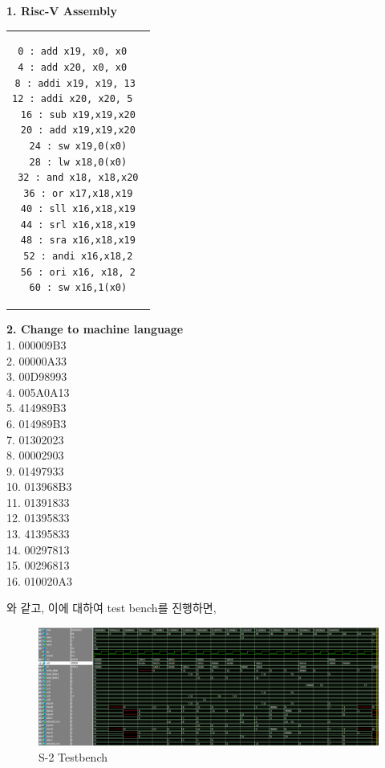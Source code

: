 \documentclass[oneside]{article}
\begin{document}
\begin{center}
\textbf{1. Risc-V Assembly}
\end{center}

\begin{center}
\begin{tabular}{c}
\begin{lstlisting}[language={[RISC-V]Assembler}]
0 : add x19, x0, x0  
4 : add x20, x0, x0  
8 : addi x19, x19, 13 
12 : addi x20, x20, 5  
16 : sub x19,x19,x20
20 : add x19,x19,x20
24 : sw x19,0(x0)
28 : lw x18,0(x0)
32 : and x18, x18,x20
36 : or x17,x18,x19
40 : sll x16,x18,x19
44 : srl x16,x18,x19
48 : sra x16,x18,x19
52 : andi x16,x18,2
56 : ori x16, x18, 2
60 : sw x16,1(x0)
\end{lstlisting}
\end{tabular}
\end{center}

\begin{center}

\end{center}

\begin{center}
\textbf{2. Change to machine language }\\
1.	000009B3\\
2.	00000A33\\
3.	00D98993\\
4.	005A0A13\\
5.	414989B3\\
6.	014989B3\\
7.	01302023\\
8.	00002903\\
9.	01497933\\
10.	013968B3\\
11.	01391833\\
12.	01395833\\
13.	41395833\\
14.	00297813\\
15.	00296813\\
16.	010020A3

\end{center}
와 같고, 이에 대하여 test bench를 진행하면,
\begin{figure}[h]
    \includegraphics[width = 18cm]{ASIC_s2.png}
    \centering
    \caption{S-2 Testbench}
\end{figure}
\end{document}
